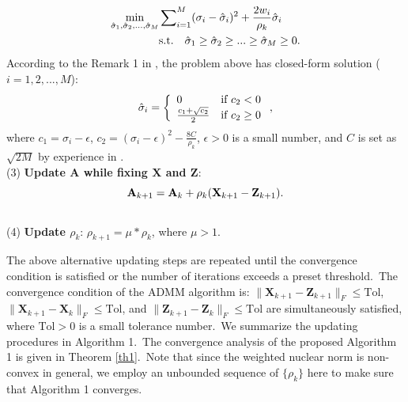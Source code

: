 \documentclass[10pt,twocolumn,letterpaper]{article}
\begin{document}
\vspace{-3mm}
\begin{equation}
\label{e15}
\vspace{-3mm}
\begin{split}
\min_{\hat{\sigma}_{1},\hat{\sigma}_{2},...,\hat{\sigma}_{M}}
&
\sum\nolimits_{i=1}^{M}
(\sigma_{i}-\hat{\sigma}_{i})^{2}
+
\frac{2w_{i}}{\rho_{k}}\hat{\sigma}_{i}
\\
&
\text{s.t.}
\quad
\hat{\sigma}_{1}\ge \hat{\sigma}_{2} \ge...\ge \hat{\sigma}_{M}\ge 0.
\end{split}
\end{equation}
According to the Remark 1 in \cite{wnnmijcv}, the problem above has closed-form solution ($i=1,2,...,M$):
\vspace{-3mm}
\begin{equation}
\label{e16}
\vspace{-2mm}
\hat{\sigma}_{i}
=
\left\{ \begin{array}{ll}
0 & \textrm{if $c_{2}<0$}\\
\frac{c_{1}+\sqrt{c_{2}}}{2} & \textrm{if $c_{2}\ge 0$}
\end{array} \right.,
\end{equation}
where $c_{1}=\sigma_{i}-\epsilon$, $c_{2} = (\sigma_{i}-\epsilon)^{2}-\frac{8C}{\rho_{k}}$, $\epsilon>0$ is a small number, and $C$ is set as $\sqrt{2M}$ by experience in \cite{wnnmijcv}.
\vspace{1mm}
 \\
(3) \textbf{Update $\mathbf{A}$ while fixing $\mathbf{X}$ and $\mathbf{Z}$}:
\vspace{-3mm}
\begin{equation}
\label{e17}
\vspace{-7mm}
\mathbf{A}_{k+1}
=
\mathbf{A}_{k} + \rho_{k}(\mathbf{X}_{k+1}-\mathbf{Z}_{k+1}).
\end{equation}
\\
(4) \textbf{Update $\rho_{k}$}: $\rho_{k+1}= \mu * \rho_{k}$, where $\mu>1$.
\vspace{1mm}

The above alternative updating steps are repeated until the convergence condition is satisfied or the number of iterations exceeds a preset threshold.\ The convergence condition of the ADMM algorithm is: $\|\mathbf{X}_{k+1}-\mathbf{Z}_{k+1}\|_{F}\le \text{Tol}$, $\|\mathbf{X}_{k+1}-\mathbf{X}_{k}\|_{F}\le \text{Tol}$, and $\|\mathbf{Z}_{k+1}-\mathbf{Z}_{k}\|_{F}\le \text{Tol}$ are simultaneously satisfied, where $\text{Tol}>0$ is a small tolerance number.\ We summarize the updating procedures in Algorithm 1.\ The convergence analysis of the proposed Algorithm 1 is given in Theorem \ref{th1}.\ Note that since the weighted nuclear norm is non-convex in general, we employ an unbounded sequence of $\{\rho_{k}\}$ here to make sure that Algorithm 1 converges. 
\end{document}
